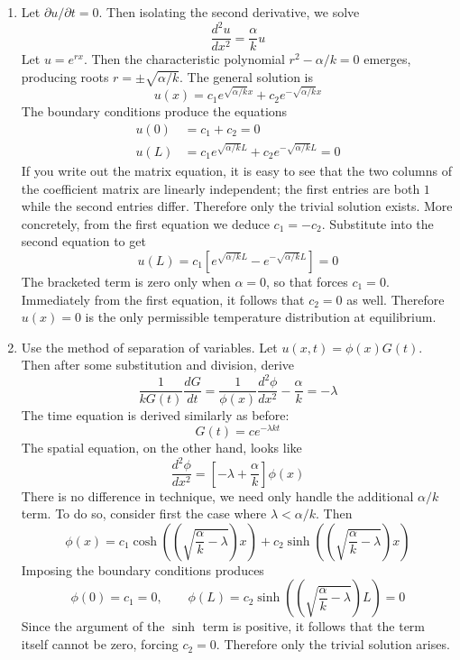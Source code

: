 \documentclass[a4paper]{article}
\begin{document}
\begin{enumerate}[label=(\alph*)]
	\item Let \( \partial u / \partial t = 0 \). Then isolating the second derivative, we solve
	\[
		\frac{d^2 u}{d x^2} = \frac{\alpha}{k}u 
	\]
	Let \( u = e^{rx} \). Then the characteristic polynomial \( r^{2} - \alpha / k = 0 \) emerges, producing roots \( r = \pm \sqrt{\alpha / k} \). The general solution is
	\[
		u \!\left( x \right) = c_{1}e^{\sqrt{\alpha / k}x} + c_{2}e^{-\sqrt{\alpha / k}x} 
	\]
	The boundary conditions produce the equations
	\begin{align*}
		u \!\left( 0 \right) & = c_{1} + c_{2} = 0 \\
		u \!\left( L \right) & = c_{1}e^{\sqrt{\alpha / k}L} + c_{2}e^{-\sqrt{\alpha / k}L} = 0
	\end{align*}
	If you write out the matrix equation, it is easy to see that the two columns of the coefficient matrix are linearly independent; the first entries are both \( 1 \) while the second entries differ. Therefore only the trivial solution exists. More concretely, from the first equation we deduce \( c_{1} = -c_{2} \). Substitute into the second equation to get
	\[
		u \!\left( L \right) = c_{1}\!\left[ e^{\sqrt{\alpha / k}L} - e^{-\sqrt{\alpha / k}L} \right] = 0 
	\]
	The bracketed term is zero only when \( \alpha = 0 \), so that forces \( c_{1} = 0 \). Immediately from the first equation, it follows that \( c_{2} = 0 \) as well. Therefore \( u \!\left( x \right) = 0 \) is the only permissible temperature distribution at equilibrium.
	\item Use the method of separation of variables. Let \( u \!\left( x,t \right) = \phi \!\left( x \right)G \!\left( t \right) \). Then after some substitution and division, derive
	\[
		\frac{1}{k G \!\left( t \right)}\frac{d G}{d t} = \frac{1}{\phi \!\left( x \right)}\frac{d^2 \phi}{d x^2} - \frac{\alpha}{k} = -\lambda 
	\]
	The time equation is derived similarly as before:
	\[
		G \!\left( t \right) = ce^{-\lambda kt} 
	\]
	The spatial equation, on the other hand, looks like
	\[
		\frac{d^2 \phi}{d x^2} = \!\left[ -\lambda + \frac{\alpha}{k} \right]\phi \!\left( x \right) 
	\]
	There is no difference in technique, we need only handle the additional \( \alpha / k \) term. To do so, consider first the case where \( \lambda < \alpha / k \). Then
	\[
		\phi \!\left( x \right) = c_{1}\cosh\!\left(\!\left( \sqrt{\frac{\alpha}{k} - \lambda}\right)x\right) + c_{2}\sinh\!\left(\!\left( \sqrt{\frac{\alpha}{k} - \lambda}\right)x\right) 
	\]
	Imposing the boundary conditions produces
	\[
		\phi \!\left( 0 \right) = c_{1} = 0, \qquad \phi \!\left( L \right) = c_{2}\sinh\!\left(\!\left( \sqrt{\frac{\alpha}{k} - \lambda} \right)L\right) = 0
	\]
	Since the argument of the \( \sinh \) term is positive, it follows that the term itself cannot be zero, forcing \( c_{2} = 0 \). Therefore only the trivial solution arises.


\end{enumerate}
\end{document}
